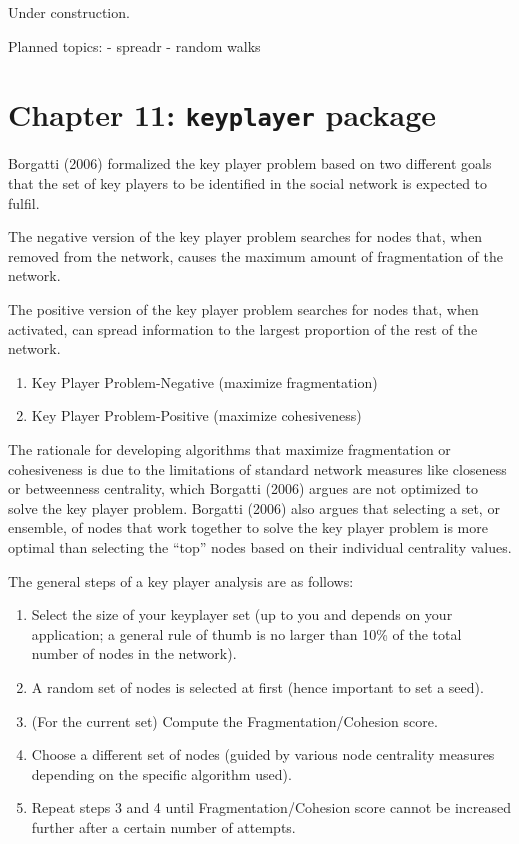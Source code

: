 \documentclass[
]{book}
\providecommand{\tightlist}{%
  \setlength{\itemsep}{0pt}\setlength{\parskip}{0pt}}
\begin{document}
Under construction.

Planned topics:
- spreadr
- random walks

\chapter{\texorpdfstring{Chapter 11: \texttt{keyplayer} package}{Chapter 11: keyplayer package}}\label{ch11}

Borgatti (2006) formalized the key player problem based on two different goals that the set of key players to be identified in the social network is expected to fulfil.

The negative version of the key player problem searches for nodes that, when removed from the network, causes the maximum amount of fragmentation of the network.

The positive version of the key player problem searches for nodes that, when activated, can spread information to the largest proportion of the rest of the network.

\begin{enumerate}
\def\labelenumi{\arabic{enumi}.}
\tightlist
\item
  Key Player Problem-Negative (maximize fragmentation)
\item
  Key Player Problem-Positive (maximize cohesiveness)
\end{enumerate}

The rationale for developing algorithms that maximize fragmentation or cohesiveness is due to the limitations of standard network measures like closeness or betweenness centrality, which Borgatti (2006) argues are not optimized to solve the key player problem. Borgatti (2006) also argues that selecting a set, or ensemble, of nodes that work together to solve the key player problem is more optimal than selecting the ``top'' nodes based on their individual centrality values.

The general steps of a key player analysis are as follows:

\begin{enumerate}
\def\labelenumi{\arabic{enumi}.}
\tightlist
\item
  Select the size of your keyplayer set (up to you and depends on your application; a general rule of thumb is no larger than 10\% of the total number of nodes in the network).
\item
  A random set of nodes is selected at first (hence important to set a seed).
\item
  (For the current set) Compute the Fragmentation/Cohesion score.
\item
  Choose a different set of nodes (guided by various node centrality measures depending on the specific algorithm used).
\item
  Repeat steps 3 and 4 until Fragmentation/Cohesion score cannot be increased further after a certain number of attempts.
\end{enumerate}
\end{document}
